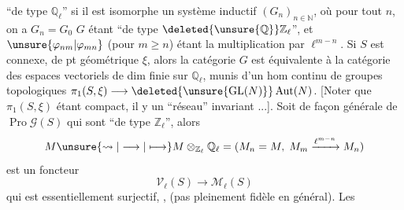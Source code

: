 ``de type $\mathbb Q_\ell$'' si il est isomorphe  un  système inductif $(G_n)_{n\in\mathbb N}$, où pour tout $n$, on a $G_n=G_0$ $G$ étant ``de type $\deleted{\unsure{\mathbb Q}}\mathbb Z_\ell$'', et $\unsure{\varphi_{nm}|\varphi_{mn}}$ (pour $m\geq n$) étant la multiplication par $\ell^{m-n}$. Si $S$ est connexe, de pt géométrique $\xi$, alors la catégorie   $G$ est équivalente à la catégorie des espaces vectoriels  de dim finie sur $\mathbb Q_\ell$, munis d'un hom continu de groupes topologiques $\pi_1(S,\xi)\longrightarrow\deleted{\unsure{\operatorname{GL}(N)}}\operatorname{Aut}(N)$. [Noter que $\pi_1(S,\xi)$ étant compact, il y  un ``réseau'' invariant ...]. Soit de façon générale   de $\operatorname{Pro}\mathscr G(S)$ qui sont ``de type $\mathbb Z_\ell$'', alors 
\[
M\unsure{\rightsquigarrow|\longrightarrow|\longmapsto}M\otimes_{\mathbb Z_\ell}\mathbb Q_\ell=(M_n=M,\;M_m\xrightarrow{\ell^{m-n}}M_n)
\]
est un foncteur
\[
\mathcal V_\ell(S)\longrightarrow\mathcal M_\ell(S)
\]
qui est essentiellement surjectif, , (pas pleinement fidèle en général). Les
